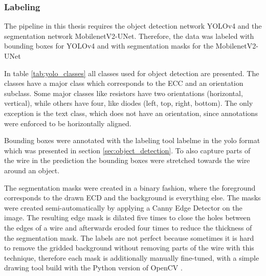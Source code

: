 \subsubsection{Labeling}

The pipeline in this thesis requires the object detection network \ac{YOLOv4} and the segmentation network MobilenetV2-UNet.
Therefore, the data was labeled with bounding boxes for \ac{YOLOv4} and with segmentation masks for the MobilenetV2-UNet

In table \ref{tab:yolo_classes} all classes used for object detection are presented.
The classes have a major class which corresponds to the \ac{ECC} and an orientation subclass.
Some major classes like resistors have two orientations (horizontal, vertical), while others have four, like diodes (left, top, right, bottom).
The only exception is the text class, which does not have an orientation, since annotations were enforced to be horizontally aligned.

Bounding boxes were annotated with the labeling tool labelme \cite{labelme} in the yolo format which was presented in section \ref{sec:object_detection}.
To also capture parts of the wire in the prediction the bounding boxes were stretched towards the wire around an object.

The segmentation masks were created in a binary fashion, where the foreground corresponds to the drawn \ac{ECD} and the background is everything else.
The masks were created semi-automatically by applying a Canny Edge Detector \cite{canny_edge} on the image.
The resulting edge mask is dilated five times to close the holes between the edges of a wire and afterwards eroded four times to reduce the thickness of the segmentation mask.
The labels are not perfect because sometimes it is hard to remove the gridded background without removing parts of the wire with this technique, therefore each mask is additionally manually fine-tuned, with a simple drawing tool build with the Python version of OpenCV \cite{opencv}.

